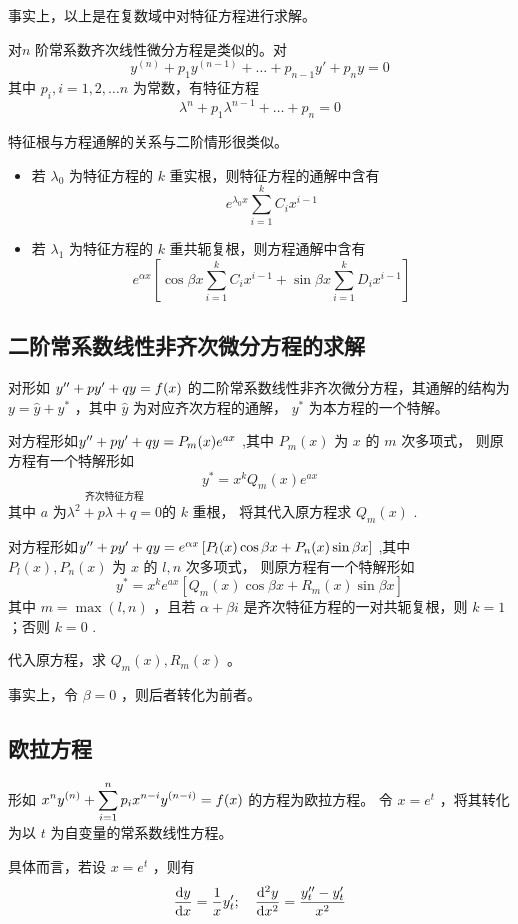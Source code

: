 事实上，以上是在复数域中对特征方程进行求解。

对$ n $ 阶常系数齐次线性微分方程是类似的。对 $$
    y^{(n)} + p_1y^{(n-1)} + \dots + p_{n-1}y' + p_ny = 0
$$ 其中 $ p_i,i=1,2,\dots n  $ 为常数，有特征方程$$
    \lambda^n + p_1\lambda^{n-1} +\dots + p_n = 0
$$ 

特征根与方程通解的关系与二阶情形很类似。

\begin{itemize}
    \item 若 $ \lambda_0 $ 为特征方程的 $ k $ 重实根，则特征方程的通解中含有$$
        e^{\lambda_0 x}\sum_{i=1}^k C_ix^{i-1}
    $$ 
    \item 若 $ \lambda_1 $ 为特征方程的 $ k $ 重共轭复根，则方程通解中含有$$
        e^{\alpha x}\left[
            \cos \beta x \sum_{i=1}^k C_ix^{i-1}+
            \sin \beta x \sum_{i=1}^k D_ix^{i-1}
        \right]
    $$ 
\end{itemize}

\subsection{二阶常系数线性非齐次微分方程的求解}

对形如 $ y^{\prime\prime}+py'+qy = f(x) $ 的二阶常系数线性非齐次微分方程，其通解的结构为
$ y = \hat y  + y^* $ ，其中 $ \hat y $ 为对应齐次方程的通解， $ y^* $ 为本方程的一个特解。

对方程形如$
    y^{\prime\prime} + py'+qy = P_m(x)e^{ax}
$ ,其中 $ P_m(x) $ 为 $ x $ 的 $ m $ 次多项式，
则原方程有一个特解形如$$
    y^* = x^k Q_m(x)e^{ax}
$$ 其中 $ a $ 为$\overset{\textrm{齐次特征方程}}{ \lambda^2 + p\lambda + q = 0  }$的 $ k $ 重根，
将其代入原方程求 $ Q_m(x) $ .

对方程形如$
    y^{\prime\prime} + py'+qy = e^{\alpha x}\left[P_l(x)\cos \beta x+P_n(x)\sin \beta x\right]
$ ,其中 $ P_l(x),P_n(x) $ 为 $ x $ 的 $ l,n $ 次多项式，
则原方程有一个特解形如$$
    y^* = x^ke^{ax}\left[Q_m(x)\cos\beta x+R_m(x)\sin \beta x\right]
$$ 其中 $ m = \max(l,n) $ ，且若 $ \alpha+\beta i $ 是齐次特征方程的一对共轭复根，则 $ k = 1 $ ；否则 $ k = 0 $ .

代入原方程，求 $ Q_m(x),R_m(x) $ 。

事实上，令 $ \beta = 0 $ ，则后者转化为前者。

\subsection{欧拉方程}

形如 $\displaystyle x^ny^{(n)} + \sum_{i=1}^np_ix^{n-i}y^{(n-i)} = f(x) $ 的方程为欧拉方程。
令 $ x = e^t $ ，将其转化为以 $ t $ 为自变量的常系数线性方程。

具体而言，若设 $ x = e^t $ ，则有
\begin{equation*}
    \begin{aligned}
        \dfrac{\mathrm{d}y}{\mathrm{d}x} = \dfrac{1}{x}y'_{t};\quad{}
        \dfrac{\mathrm{d}^2y}{\mathrm{d}x^2} = \dfrac{y^{\prime\prime}_t - y'_t}{x^2}
    \end{aligned}
\end{equation*}